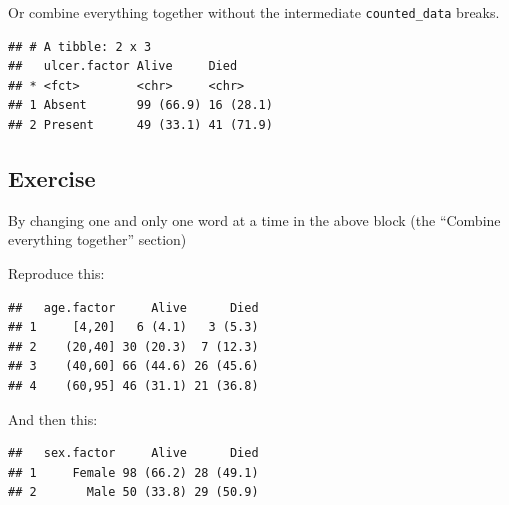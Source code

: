 \documentclass[]{book}
\makeatletter
\newenvironment{Shaded}{\begin{snugshade}}{\end{snugshade}}
\newcommand{\KeywordTok}[1]{\textcolor[rgb]{0.13,0.29,0.53}{\textbf{#1}}}
\newcommand{\DataTypeTok}[1]{\textcolor[rgb]{0.13,0.29,0.53}{#1}}
\newcommand{\DecValTok}[1]{\textcolor[rgb]{0.00,0.00,0.81}{#1}}
\newcommand{\StringTok}[1]{\textcolor[rgb]{0.31,0.60,0.02}{#1}}
\newcommand{\OperatorTok}[1]{\textcolor[rgb]{0.81,0.36,0.00}{\textbf{#1}}}
\newcommand{\NormalTok}[1]{#1}
\newenvironment{kframe}{%
\medskip{}
\setlength{\fboxsep}{.8em}
 \def\at@end@of@kframe{}%
 \ifinner\ifhmode%
  \def\at@end@of@kframe{\end{minipage}}%
  \begin{minipage}{\columnwidth}%
 \fi\fi%
 \def\FrameCommand##1{\hskip\@totalleftmargin \hskip-\fboxsep
 \colorbox{shadecolor}{##1}\hskip-\fboxsep
     \hskip-\linewidth \hskip-\@totalleftmargin \hskip\columnwidth}%
 \MakeFramed {\advance\hsize-\width
   \@totalleftmargin\z@ \linewidth\hsize
   \@setminipage}}%
 {\par\unskip\endMakeFramed%
 \at@end@of@kframe}
\renewenvironment{Shaded}{\begin{kframe}}{\end{kframe}}
\makeatother
\begin{document}
Or combine everything together without the intermediate
\texttt{counted\_data} breaks.

\begin{Shaded}
\end{Shaded}

\begin{verbatim}
## # A tibble: 2 x 3
##   ulcer.factor Alive     Died     
## * <fct>        <chr>     <chr>    
## 1 Absent       99 (66.9) 16 (28.1)
## 2 Present      49 (33.1) 41 (71.9)
\end{verbatim}

\subsection{Exercise}\label{exercise-42}

By changing one and only one word at a time in the above block (the
``Combine everything together'' section)

Reproduce this:

\begin{verbatim}
##   age.factor     Alive      Died
## 1     [4,20]   6 (4.1)   3 (5.3)
## 2    (20,40] 30 (20.3)  7 (12.3)
## 3    (40,60] 66 (44.6) 26 (45.6)
## 4    (60,95] 46 (31.1) 21 (36.8)
\end{verbatim}

And then this:

\begin{verbatim}
##   sex.factor     Alive      Died
## 1     Female 98 (66.2) 28 (49.1)
## 2       Male 50 (33.8) 29 (50.9)
\end{verbatim}
\end{document}
